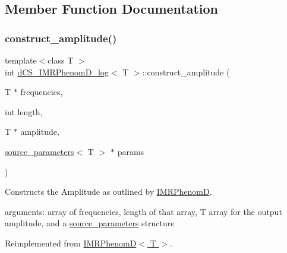\subsection{Member Function Documentation}
\mbox{\label{classdCS__IMRPhenomD__log_a769498326cbe7738a855fc93201f6e6a}} 
\subsubsection{\texorpdfstring{construct\+\_\+amplitude()}{construct\_amplitude()}}
{\footnotesize\ttfamily template$<$class T $>$ \\
int \hyperlink{classdCS__IMRPhenomD__log}{d\+C\+S\+\_\+\+I\+M\+R\+Phenom\+D\+\_\+log}$<$ T $>$\+::construct\+\_\+amplitude (\begin{DoxyParamCaption}\item[{T $\ast$}]{frequencies,  }\item[{int}]{length,  }\item[{T $\ast$}]{amplitude,  }\item[{\hyperlink{structsource__parameters}{source\+\_\+parameters}$<$ T $>$ $\ast$}]{params }\end{DoxyParamCaption})\hspace{0.3cm}{\ttfamily [virtual]}}



Constructs the Amplitude as outlined by \hyperlink{classIMRPhenomD}{I\+M\+R\+PhenomD}. 

arguments\+: array of frequencies, length of that array, T array for the output amplitude, and a \hyperlink{structsource__parameters}{source\+\_\+parameters} structure 

Reimplemented from \hyperlink{classIMRPhenomD_a95e7946061fa24fdb7a770dba02147be}{I\+M\+R\+Phenom\+D$<$ T $>$}.

\mbox{\label{classdCS__IMRPhenomD__log_a6f26f618b1ab6e41ae32eb94fefcc185}} 
